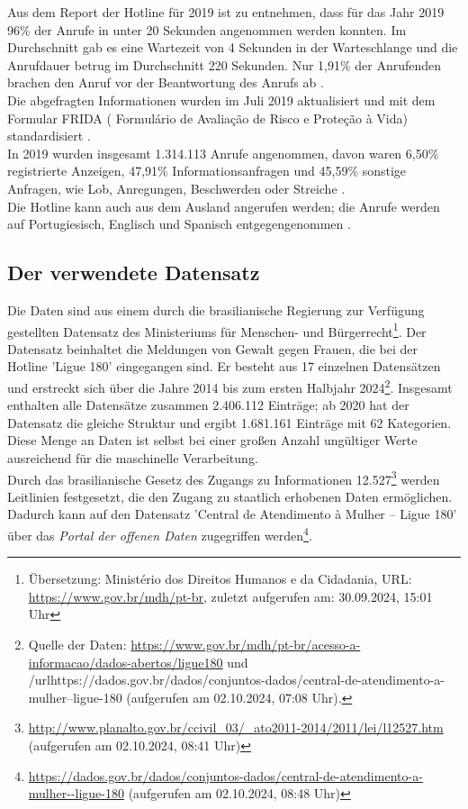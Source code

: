 \documentclass[12pt]{report}
\begin{document}
	Aus dem Report der Hotline für 2019 ist zu entnehmen, dass für das Jahr 2019 96\% der Anrufe in unter 20 Sekunden angenommen werden konnten. Im Durchschnitt gab es eine Wartezeit von 4 Sekunden in der Warteschlange und die Anrufdauer betrug im Durchschnitt 220 Sekunden. Nur 1,91\% der Anrufenden brachen den Anruf vor der Beantwortung des Anrufs ab \cite[S. 12]{BalancoLigue180.2020}.\\
	Die abgefragten Informationen wurden im Juli 2019 aktualisiert und mit dem Formular FRIDA ( Formulário de Avaliação de Risco e Proteção à Vida) standardisiert \cite[S. 13]{BalancoLigue180.2020}.\\
	In 2019 wurden insgesamt 1.314.113 Anrufe angenommen, davon waren 6,50\% registrierte Anzeigen, 47,91\% Informationsanfragen und 45,59\% sonstige Anfragen, wie Lob, Anregungen, Beschwerden oder Streiche \cite[S. 14]{BalancoLigue180.2020}.\\
	Die Hotline kann auch aus dem Ausland angerufen werden; die Anrufe werden auf Portugiesisch, Englisch und Spanisch entgegengenommen \cite[S. 15]{BalancoLigue180.2020}. 
	\subsection{Der verwendete Datensatz}
	Die Daten sind aus einem durch die brasilianische Regierung zur Verfügung gestellten Datensatz des Ministeriums für Menschen- und Bürgerrecht\footnote{Übersetzung: Ministério dos Direitos Humanos e da Cidadania, URL: \url{https://www.gov.br/mdh/pt-br}, zuletzt aufgerufen am: 30.09.2024, 15:01 Uhr}. Der Datensatz beinhaltet die Meldungen von Gewalt gegen Frauen,  die bei der Hotline 'Ligue 180' eingegangen sind. Er besteht aus 17 einzelnen Datensätzen und erstreckt sich über die Jahre 2014 bis zum ersten Halbjahr 2024\footnote{Quelle der Daten: \url{https://www.gov.br/mdh/pt-br/acesso-a-informacao/dados-abertos/ligue180} und /url{https://dados.gov.br/dados/conjuntos-dados/central-de-atendimento-a-mulher--ligue-180} (aufgerufen am 02.10.2024, 07:08 Uhr).}. %
	Insgesamt enthalten alle Datensätze zusammen 2.406.112 Einträge; ab 2020 hat der Datensatz die gleiche Struktur und ergibt 1.681.161 Einträge mit 62 Kategorien. Diese Menge an Daten ist selbst bei einer großen Anzahl ungültiger Werte ausreichend für die maschinelle Verarbeitung.\\
	Durch das brasilianische Gesetz des Zugangs zu Informationen 12.527\footnote{\url{http://www.planalto.gov.br/ccivil_03/_ato2011-2014/2011/lei/l12527.htm} %
	(aufgerufen am 02.10.2024, 08:41 Uhr)} werden Leitlinien festgesetzt, die den Zugang zu staatlich erhobenen Daten ermöglichen. Dadurch kann auf den Datensatz 'Central de Atendimento à Mulher – Ligue 180' über das \textit{Portal der offenen Daten} zugegriffen werden\footnote{\url{https://dados.gov.br/dados/conjuntos-dados/central-de-atendimento-a-mulher--ligue-180} (aufgerufen am 02.10.2024, 08:48 Uhr)}.
\end{document}
